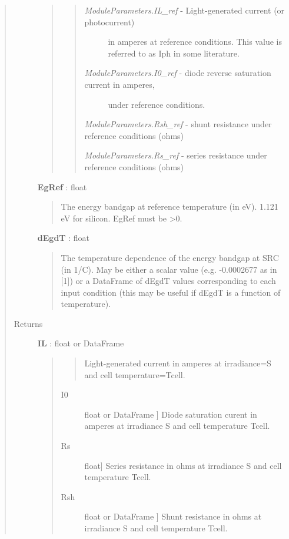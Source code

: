 \documentclass[letterpaper,10pt,english]{sphinxmanual}
\begin{document}
\begin{fulllineitems}
\begin{quote}
\begin{description}
\begin{quote}
\begin{quote}
\begin{description}
\item[{\emph{ModuleParameters.IL\_ref} - Light-generated current (or photocurrent) }] \leavevmode
in amperes at reference conditions. This value is referred to 
as Iph in some literature.

\item[{\emph{ModuleParameters.I0\_ref} - diode reverse saturation current in amperes, }] \leavevmode
under reference conditions.

\end{description}

\emph{ModuleParameters.Rsh\_ref} - shunt resistance under reference conditions (ohms)

\emph{ModuleParameters.Rs\_ref} - series resistance under reference conditions (ohms)
\end{quote}
\end{quote}

\textbf{EgRef} : float
\begin{quote}

The energy bandgap at reference temperature (in eV). 1.121 eV for silicon. EgRef must be \textgreater{}0.
\end{quote}

\textbf{dEgdT} : float
\begin{quote}

The temperature dependence of the energy bandgap at SRC (in 1/C).
May be either a scalar value (e.g. -0.0002677 as in {[}1{]}) or a
DataFrame of dEgdT values corresponding to each input condition (this
may be useful if dEgdT is a function of temperature).
\end{quote}

\item[{Returns}] \leavevmode
\textbf{IL} : float or DataFrame
\begin{quote}
\begin{quote}

Light-generated current in amperes at irradiance=S and 
cell temperature=Tcell.
\end{quote}
\begin{description}
\item[{I0}] \leavevmode{[}float or DataFrame {]}
Diode saturation curent in amperes at irradiance S and cell temperature Tcell.

\item[{Rs}] \leavevmode{[}float{]}
Series resistance in ohms at irradiance S and cell temperature Tcell.

\item[{Rsh}] \leavevmode{[}float or DataFrame {]}
Shunt resistance in ohms at irradiance S and cell temperature Tcell.


\end{description}
\end{quote}
\end{description}
\end{quote}
\end{fulllineitems}
\end{document}
